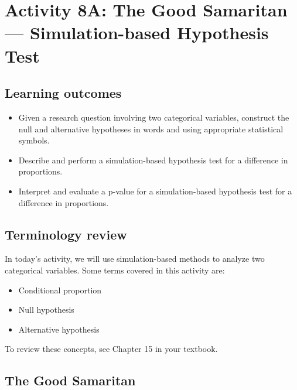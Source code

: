 \documentclass[
]{report}
\begin{document}
\newpage

\hypertarget{activity-8a-the-good-samaritan-simulation-based-hypothesis-test}{%
\section{Activity 8A: The Good Samaritan --- Simulation-based Hypothesis Test}\label{activity-8a-the-good-samaritan-simulation-based-hypothesis-test}}


\hypertarget{learning-outcomes-14}{%
\subsection{Learning outcomes}\label{learning-outcomes-14}}

\begin{itemize}
\item
  Given a research question involving two categorical variables, construct the null and alternative hypotheses
  in words and using appropriate statistical symbols.
\item
  Describe and perform a simulation-based hypothesis test for a difference in proportions.
\item
  Interpret and evaluate a p-value for a simulation-based hypothesis test for a difference in proportions.
\end{itemize}

\hypertarget{terminology-review-13}{%
\subsection{Terminology review}\label{terminology-review-13}}

In today's activity, we will use simulation-based methods to analyze two categorical variables. Some terms covered in this activity are:

\begin{itemize}
\item
  Conditional proportion
\item
  Null hypothesis
\item
  Alternative hypothesis
\end{itemize}

To review these concepts, see Chapter 15 in your textbook.

\hypertarget{the-good-samaritan}{%
\subsection{The Good Samaritan}\label{the-good-samaritan}}
\end{document}
